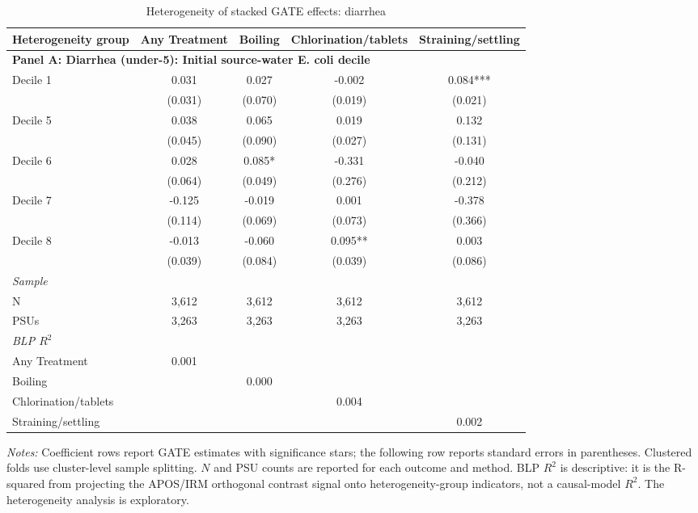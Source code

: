 \begin{landscape}
\begin{table}[p]
\centering
\caption{Heterogeneity of stacked GATE effects: diarrhea}
\label{tab:table_heterogeneity_main-diarrhea}
\scriptsize\setlength{\tabcolsep}{4pt}
\begin{adjustbox}{max width=\linewidth, center}
\begin{tabular}{lcccc}
\toprule
Heterogeneity group & Any Treatment & Boiling & Chlorination/tablets & Straining/settling \\
\midrule
\multicolumn{5}{l}{\textbf{Panel A: Diarrhea (under-5): Initial source-water E. coli decile}} \\
Decile 1 & 0.031 & 0.027 & -0.002 & 0.084*** \\
 & (0.031) & (0.070) & (0.019) & (0.021) \\
Decile 5 & 0.038 & 0.065 & 0.019 & 0.132 \\
 & (0.045) & (0.090) & (0.027) & (0.131) \\
Decile 6 & 0.028 & 0.085* & -0.331 & -0.040 \\
 & (0.064) & (0.049) & (0.276) & (0.212) \\
Decile 7 & -0.125 & -0.019 & 0.001 & -0.378 \\
 & (0.114) & (0.069) & (0.073) & (0.366) \\
Decile 8 & -0.013 & -0.060 & 0.095** & 0.003 \\
 & (0.039) & (0.084) & (0.039) & (0.086) \\
\multicolumn{5}{l}{\textit{Sample}} \\
\quad N & 3,612 & 3,612 & 3,612 & 3,612 \\
\quad PSUs & 3,263 & 3,263 & 3,263 & 3,263 \\
\multicolumn{5}{l}{\textit{BLP $R^{2}$}} \\
\quad Any Treatment & 0.001 &  &  &  \\
\quad Boiling &  & 0.000 &  &  \\
\quad Chlorination/tablets &  &  & 0.004 &  \\
\quad Straining/settling &  &  &  & 0.002 \\
\bottomrule
\end{tabular}
\end{adjustbox}
\par\vspace{3pt}
\begin{minipage}{\linewidth}\footnotesize \textit{Notes:} Coefficient rows report GATE estimates with significance stars; the following row reports standard errors in parentheses. Clustered folds use cluster-level sample splitting. $N$ and PSU counts are reported for each outcome and method. BLP $R^2$ is descriptive: it is the R-squared from projecting the APOS/IRM orthogonal contrast signal onto heterogeneity-group indicators, not a causal-model $R^2$. The heterogeneity analysis is exploratory.\end{minipage}
\end{table}
\end{landscape}